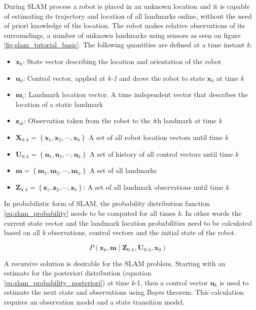 During SLAM process a robot is placed in an unknown location and it is capable of estimating its trajectory and 
location of all landmarks online, without the need of priori knowledge of the location. The robot makes relative
observations of its surroundings, a number of unknown landmarks using sensors as seen on figure \ref{fig:slam_tutorial_basic}.
The following quantities are defined at a time instant \emph{k}:
\begin{itemize}
	\item $\mathbf{x}_{k}$: State vector describing the location and orientation of the robot
	\item $\mathbf{u}_{k}$: Control vector, applied at \emph{k-1} and drove the robot to state $\mathbf{x}_{k}$ at time \emph{k}
	\item $\mathbf{m}_i$: Landmark location vector. A time independent vector that describes the location of a static landmark
	\item $\mathbf{z}_{ik}$: Observation taken from the robot to the \emph{i}th landmark at time \emph{k}
	\item $\mathbf{X}_{0:k}=\left \{ \mathbf{x}_1,\mathbf{x}_2,\cdots,\mathbf{x}_k \right \}$ A set of all robot location vectors until time \emph{k}
	\item $\mathbf{U}_{0:k}=\left \{ \mathbf{u}_1,\mathbf{u}_2,\cdots,\mathbf{u}_k \right \}$ A set of history of all control vectors until time \emph{k}
	\item $\mathbf{m}=\left \{ \mathbf{m}_1,\mathbf{m}_2,\cdots,\mathbf{m}_n \right \}$ A set of all landmarks
	\item $\mathbf{Z}_{0:k}=\left \{ \mathbf{z}_1,\mathbf{z}_2,\cdots,\mathbf{z}_k \right \}$: A set of all landmark observations until time \emph{k}
\end{itemize}

In probabilistic form of SLAM, the probability distribution function \ref{eq:slam_probability} needs to be computed for
all times \emph{k}. In other words the current state vector and the landmark location probabilities need to be calculated
based on all \emph{k} observations, control vectors and the initial state of the robot.

\begin{equation} \label{eq:slam_probability}
    P\left ( \mathbf{x}_{k},\mathbf{m}\mid \mathbf{Z}_{0:k},\mathbf{U}_{0:k},\mathbf{x}_{0}\right )
\end{equation}

A recursive solution is desirable for the SLAM problem. Starting with an estimate for the posteriori distribution 
(equation \ref{eq:slam_probability_posteriori}) at time \emph{k}-1, then a control vector $\mathbf{u}_{k}$ is used to
estimate the next state and observations using Bayes theorem. This calculation requires an observation model and a 
state transition model.
 


